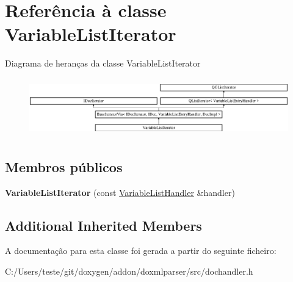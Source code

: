 \hypertarget{class_variable_list_iterator}{\section{Referência à classe Variable\-List\-Iterator}
\label{class_variable_list_iterator}
}
Diagrama de heranças da classe Variable\-List\-Iterator\begin{figure}[H]
\begin{center}
\leavevmode
\includegraphics[height=2.562929cm]{class_variable_list_iterator}
\end{center}
\end{figure}
\subsection*{Membros públicos}
\begin{DoxyCompactItemize}
\item 
\hypertarget{class_variable_list_iterator_a08b10dc27bef3ac42c3748b58cb0e356}{{\bfseries Variable\-List\-Iterator} (const \hyperlink{class_variable_list_handler}{Variable\-List\-Handler} \&handler)}\label{class_variable_list_iterator_a08b10dc27bef3ac42c3748b58cb0e356}

\end{DoxyCompactItemize}
\subsection*{Additional Inherited Members}


A documentação para esta classe foi gerada a partir do seguinte ficheiro\-:\begin{DoxyCompactItemize}
\item 
C\-:/\-Users/teste/git/doxygen/addon/doxmlparser/src/dochandler.\-h\end{DoxyCompactItemize}
